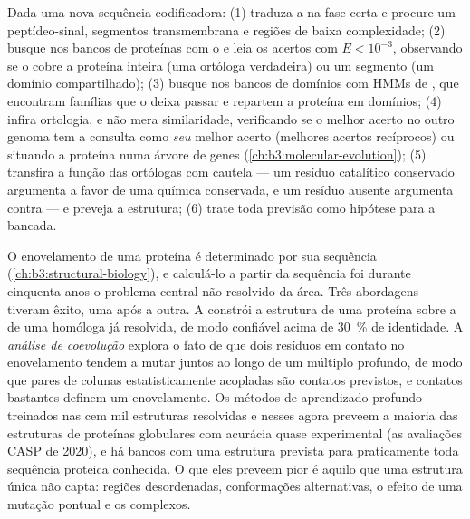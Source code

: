 \begin{method}\label{met:b3:bioinformatics:annotate}
Dada uma nova sequência codificadora: (1) traduza-a na fase certa e
procure um peptídeo-sinal, segmentos transmembrana e regiões de baixa
complexidade; (2) busque nos bancos de proteínas com o  e leia os
acertos com $E < 10^{-3}$, observando se o  cobre a proteína
inteira (uma ortóloga verdadeira) ou um segmento (um domínio
compartilhado); (3) busque nos bancos de domínios com HMMs de ,
que encontram famílias que o  deixa passar e repartem a proteína
em domínios; (4) infira ortologia, e não mera similaridade, verificando
se o melhor acerto no outro genoma tem a consulta como \emph{seu}
melhor acerto (melhores acertos recíprocos) ou situando a proteína numa
árvore de genes (\cref{ch:b3:molecular-evolution}); (5) transfira a
função das ortólogas com cautela --- um resíduo catalítico conservado
argumenta a favor de uma química conservada, e um resíduo ausente
argumenta contra --- e preveja a estrutura; (6) trate toda previsão
como hipótese para a bancada.
\end{method}

\begin{proposition}\label{prop:b3:bioinformatics:structure}
O enovelamento de uma proteína é determinado por sua sequência
(\cref{ch:b3:structural-biology}), e calculá-lo a partir da sequência
foi durante cinquenta anos o problema central não resolvido da área.
Três abordagens tiveram êxito, uma após a outra. A \emph{} constrói a estrutura de uma proteína sobre a de uma homóloga
já resolvida, de modo confiável acima de \qty{30}{\%} de identidade. A
\emph{análise de coevolução} explora o fato de que dois resíduos em
contato no enovelamento tendem a mutar juntos ao longo de um
 múltiplo profundo, de modo que pares de colunas
estatisticamente acopladas são contatos previstos, e contatos
bastantes definem um enovelamento. Os métodos de aprendizado profundo
treinados nas cem mil estruturas resolvidas e nesses  agora
preveem a maioria das estruturas de proteínas globulares com acurácia
quase experimental (as avaliações CASP de 2020), e há bancos com uma
estrutura prevista para praticamente toda sequência proteica conhecida.
O que eles preveem pior é aquilo que uma estrutura única não capta:
regiões desordenadas, conformações alternativas, o efeito de uma
mutação pontual e os complexos.
\end{proposition}


